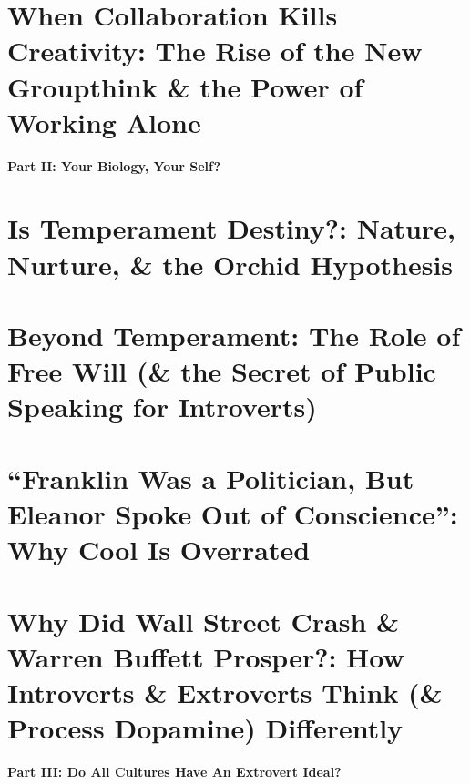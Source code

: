 \documentclass{article}
\numberwithin{equation}{section}
\begin{document}

\section{When Collaboration Kills Creativity: The Rise of the New Groupthink \& the Power of Working Alone}


\begin{center}\LARGE\sf
	\textbf{Part II: Your Biology, Your Self?}
\end{center}

\section{Is Temperament Destiny?: Nature, Nurture, \& the Orchid Hypothesis}


\section{Beyond Temperament: The Role of Free Will (\& the Secret of Public Speaking for Introverts)}


\section{``Franklin Was a Politician, But Eleanor Spoke Out of Conscience'': Why Cool Is Overrated}


\section{Why Did Wall Street Crash \& Warren Buffett Prosper?: How Introverts \& Extroverts Think (\& Process Dopamine) Differently}


\begin{center}\LARGE\sf
	\textbf{Part III: Do All Cultures Have An Extrovert Ideal?}
\end{center}
\end{document}
